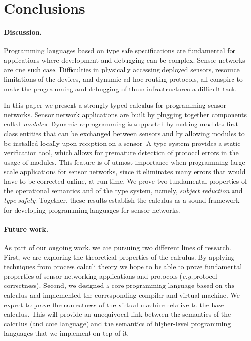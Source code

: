 \documentclass[copyright,creativecommons]{eptcs}
\def\eg{\emph{e.g.}\;}
\begin{document}
\section{Conclusions}
\label{sec:conclusions}

\paragraph{Discussion.}
\label{sec:discussion}

Programming languages based on type safe specifications are
fundamental for applications where development and debugging can be
complex. Sensor networks are one such case. Difficulties in physically
accessing deployed sensors, resource limitations of the devices, and
dynamic ad-hoc routing protocols, all conspire to make the programming
and debugging of these infrastructures a difficult task.

In this paper we present a strongly typed calculus for programming
sensor networks. Sensor network applications are built by plugging
together components called \emph{modules}. Dynamic reprogramming 
is supported by making modules first class entities that
can be exchanged between sensors and by allowing modules to be
installed locally upon reception on a sensor. A type system provides a
static verification tool, which allows for premature detection of
protocol errors in the usage of modules. This feature is of utmost
importance when programming large-scale applications for sensor
networks, since it eliminates many errors that would have to be
corrected online, at run-time. We prove two fundamental
properties of the operational semantics and of the type system,
namely, \emph{subject reduction} and \emph{type safety}. Together,
these results establish the calculus as a sound framework for
developing programming languages for sensor networks.


\paragraph{Future work.}
As part of our ongoing work, we are pursuing two different lines of
research. First, we are exploring the theoretical properties of the
calculus. By applying techniques from process calculi theory we hope
to be able to prove fundamental properties of sensor networking
applications and protocols (\eg protocol correctness). Second, we
designed a core programming language based on the calculus and
implemented the corresponding compiler and virtual machine. We expect
to prove the correctness of the virtual machine relative to the base
calculus.  This will provide an unequivocal link between the semantics
of the calculus (and core language) and the semantics of higher-level
programming languages that we implement on top of it.
\end{document}
